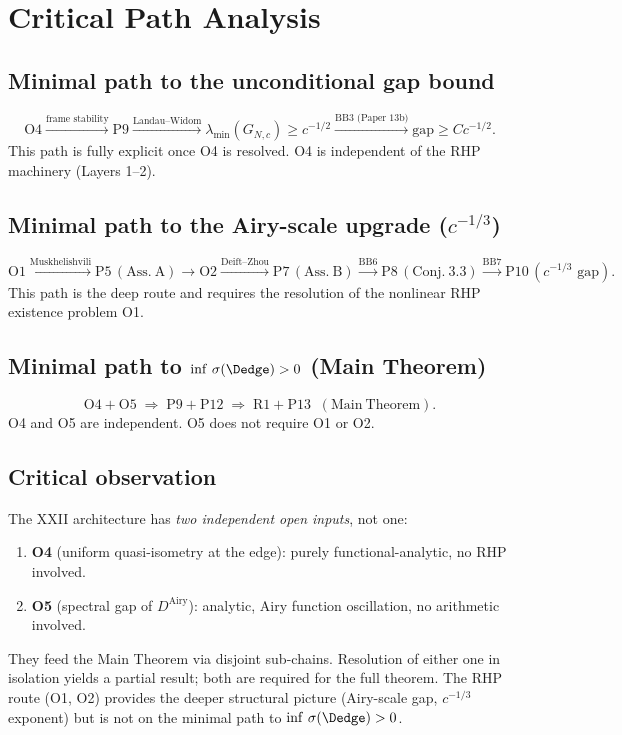 \documentclass[12pt,a4paper]{amsart}
\theoremstyle{definition}
\begin{document}
\section{Critical Path Analysis}
\label{sec:critical_path}

\subsection{Minimal path to the unconditional gap bound}
\[
  \text{O4}
  \xrightarrow{\text{frame stability}}
  \text{P9}
  \xrightarrow{\text{Landau--Widom}}
  \lambda_{\min}(G_{N,c})\ge c^{-1/2}
  \xrightarrow{\text{BB3 (Paper~13b)}}
  \text{gap}\ge Cc^{-1/2}.
\]
This path is fully explicit once O4 is resolved.
O4 is independent of the RHP machinery (Layers 1--2).

\subsection{Minimal path to the Airy-scale upgrade ($c^{-1/3}$)}
\[
  \text{O1}
  \xrightarrow{\text{Muskhelishvili}}
  \text{P5}\,(\mathrm{Ass.~A})
  \xrightarrow{}
  \text{O2}
  \xrightarrow{\text{Deift--Zhou}}
  \text{P7}\,(\mathrm{Ass.~B})
  \xrightarrow{\text{BB6}}
  \text{P8}\,(\mathrm{Conj.~3.3})
  \xrightarrow{\text{BB7}}
  \text{P10}\,(c^{-1/3}\text{ gap}).
\]
This path is the deep route and requires the resolution of
the nonlinear RHP existence problem O1.

\subsection{Minimal path to $\inf\,\sigma(\Dedge)>0$ (Main Theorem)}
\[
  \text{O4} + \text{O5}
  \;\Rightarrow\;
  \text{P9} + \text{P12}
  \;\Rightarrow\;
  \text{R1} + \text{P13}\;\;(\mathrm{Main~Theorem}).
\]
O4 and O5 are independent.
O5 does not require O1 or O2.

\subsection{Critical observation}

The XXII architecture has \emph{two independent open inputs},
not one:
\begin{enumerate}[label=(\roman*),nosep]
  \item \textbf{O4} (uniform quasi-isometry at the edge):
    purely functional-analytic, no RHP involved.
  \item \textbf{O5} (spectral gap of $D^{\mathrm{Airy}}$):
    analytic, Airy function oscillation, no arithmetic involved.
\end{enumerate}
They feed the Main Theorem via disjoint sub-chains.
Resolution of either one in isolation yields a partial result;
both are required for the full theorem.
The RHP route (O1, O2) provides the deeper structural picture
(Airy-scale gap, $c^{-1/3}$ exponent) but is not on the
minimal path to $\inf\,\sigma(\Dedge)>0$.
\end{document}

